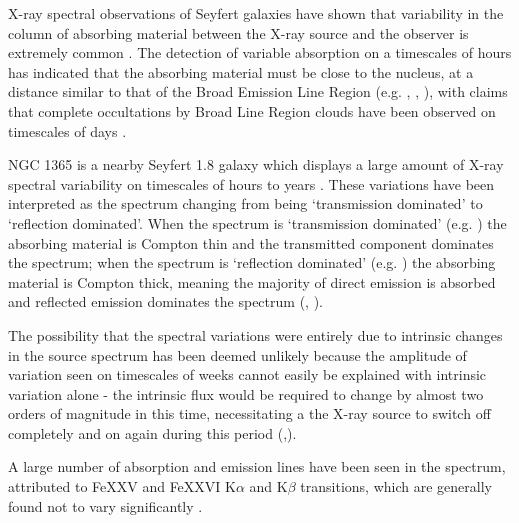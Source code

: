 \documentclass[useAMS,usenatbib]{sam}
\begin{document}
X-ray spectral observations of Seyfert galaxies have shown that variability in the column of absorbing material between the X-ray source and the observer is extremely
common \citep{risaliti02}. The detection of variable absorption on a timescales of hours has indicated that the absorbing material must be close to the nucleus, at a
distance similar to that of the Broad Emission Line Region  (e.g. \citet{lamer}, \citet{elvis04}, \citet{puccetti}), with claims that complete occultations by Broad Line
Region clouds have been observed on timescales of days \citep{risaliti07a}.


NGC 1365 is a nearby Seyfert 1.8 galaxy \citep{maiolino95} which displays a large amount of X-ray spectral variability \citep{risaliti09} on timescales of hours
to years \citep{brenneman}. These variations have been interpreted as the spectrum changing from being `transmission dominated' to `reflection
dominated'. When the spectrum is `transmission dominated' (e.g. \citet{risaliti00}) the absorbing material is Compton thin and the transmitted component dominates the
spectrum; when the spectrum is `reflection dominated' (e.g. \citet{iyomoyo}) the absorbing material is Compton thick, meaning the majority of direct emission is absorbed
and reflected emission dominates the spectrum (\citet{risaliti07b}, \citet{matt}). 


The possibility that the spectral variations were entirely due to intrinsic changes in the source spectrum has been deemed unlikely because the amplitude of variation
seen on timescales of weeks cannot easily be explained with intrinsic variation alone - the intrinsic flux would be required to change by almost two orders of magnitude
in this time, necessitating a the X-ray source to switch off completely and on again during this period (\citep{risaliti07b},\citep{risaliti05b}). 

A large number of absorption and emission lines have been seen in the spectrum, attributed to FeXXV and FeXXVI K$\alpha$ and K$\beta$ transitions, which are generally
found not to vary significantly \citep{risaliti05b}.
\end{document}
